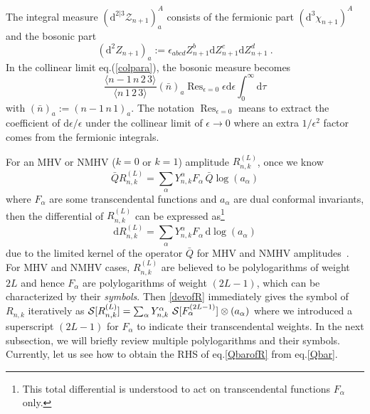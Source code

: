 \documentclass[a4paper,12pt]{article}
\newcommand{\dif}{\mathrm{d}} %
\begin{document}
The integral measure $(\mathrm{d}^{2\vert 3}\mathcal{Z}_{n+1})_{a}^{A}$ consists of the fermionic part $(\mathrm{d}^{3}\chi_{n+1})^{A}$ and the bosonic part 
\[
    (\mathrm{d}^{2}Z_{n+1})_{a}:=\epsilon_{abcd}Z_{n+1}^{b}\mathrm{d}Z_{n+1}^{c}\mathrm{d}Z_{n+1}^{d} \:.
\]
In the collinear limit eq.(\ref{colpara}), the bosonic measure becomes
\begin{equation}\label{bosonicmeasure}
\frac{\langle n{-}1\,n\,2\,3\rangle}{\langle n\,1\,2\,3\rangle}(\bar{n})_{a}\operatorname{Res}_{\epsilon=0}\epsilon\mathrm{d}\epsilon\int_{0}^{\infty} \mathrm{d}\tau
\end{equation}
with $(\bar{n})_{a}:=(n{-}1\,n\,1)_{a}$. The notation $\operatorname{Res}_{\epsilon=0}$ means to extract the coefficient of $\mathrm{d}\epsilon/\epsilon$ under the collinear limit of $\epsilon\to 0$ where an extra $1/\epsilon^2$ factor comes from the fermionic integrals.


For an MHV or NMHV ($k=0$ or $k=1$) amplitude $R_{n,k}^{(L)}$, once we know
\begin{equation} \label{QbarofR}
    \bar{Q} R_{n,k}^{(L)}=\sum_\alpha Y_{n,k}^{\alpha}F_\alpha\, \bar{Q}\log(a_\alpha) 
\end{equation}
where $F_{\alpha}$ are some transcendental functions and $a_{\alpha}$ are dual conformal invariants, 
then the differential of $R_{n, k}^{(L)}$ can be expressed as\footnote{This total differential is understood to act on transcendental functions $F_{\alpha}$ only.}
\begin{equation} \label{devofR}
    \dif R_{n,k}^{(L)}=\sum_\alpha Y_{n,k}^{\alpha}F_\alpha\, \dif \log(a_\alpha) 
\end{equation}
due to the limited kernel of the operator $\bar Q$ for MHV and NMHV amplitudes~\cite{CaronHuot:2011kk}. For MHV and NMHV cases, $R_{n,k}^{(L)}$ are believed to be polylogarithms of weight $2L$ and hence $F_{\alpha}$ are polylogarithms of weight $(2L{-}1)$, which can be characterized by their \emph{symbols}. Then \eqref{devofR} immediately gives the symbol of $R_{n,k}$ iteratively as ${\cal S}[ R_{n,k}^{(L)}]=\sum_\alpha Y_{n,k}^{\alpha}~{\cal S} [F^{(2L{-}1)}_\alpha] \otimes (a_\alpha)$ where we introduced a superscript $(2L{-}1)$ for $F_{\alpha}$ to indicate their transcendental weights. 
In the next subsection, we will briefly review multiple polylogarithms and their symbols. Currently, let us see how to obtain the RHS of eq.\eqref{QbarofR} from eq.\eqref{Qbar}.
\end{document}
